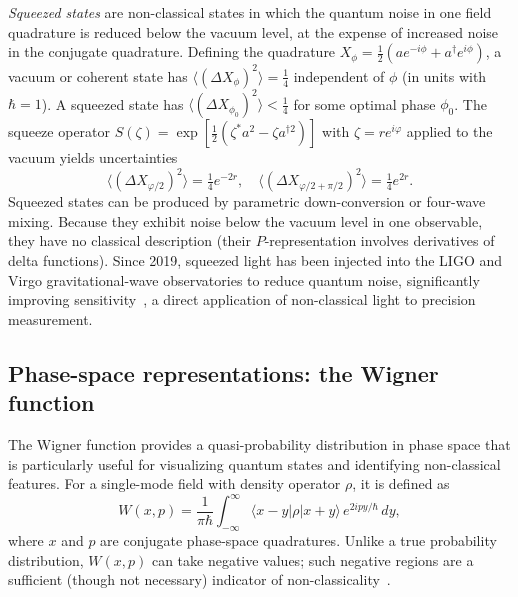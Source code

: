 \documentclass[12pt]{iopart}
\begin{document}
\textit{Squeezed states} are non-classical states in which the quantum noise in one field quadrature is reduced below the vacuum level, at the expense of increased noise in the conjugate quadrature. Defining the quadrature $X_\phi = \tfrac{1}{2}(a e^{-i\phi} + a^\dagger e^{i\phi})$, a vacuum or coherent state has $\langle(\Delta X_\phi)^2\rangle = \tfrac{1}{4}$ independent of $\phi$ (in units with $\hbar = 1$). A squeezed state has $\langle(\Delta X_{\phi_0})^2\rangle < \tfrac{1}{4}$ for some optimal phase $\phi_0$. The squeeze operator $S(\zeta) = \exp[\tfrac{1}{2}(\zeta^* a^2 - \zeta a^{\dagger 2})]$ with $\zeta = r e^{i\varphi}$ applied to the vacuum yields uncertainties
\begin{equation}
\langle (\Delta X_{\varphi/2})^2 \rangle = \tfrac{1}{4} e^{-2r}, \quad
\langle (\Delta X_{\varphi/2 + \pi/2})^2 \rangle = \tfrac{1}{4} e^{2r}.
\label{eq:squeeze}
\end{equation}
Squeezed states can be produced by parametric down-conversion or four-wave mixing. Because they exhibit noise below the vacuum level in one observable, they have no classical description (their $P$-representation involves derivatives of delta functions). Since 2019, squeezed light has been injected into the LIGO and Virgo gravitational-wave observatories to reduce quantum noise, significantly improving sensitivity~\cite{aasi2013, tse2019}, a direct application of non-classical light to precision measurement.


\subsection{Phase-space representations: the Wigner function}
\label{sec:wigner}

The Wigner function provides a quasi-probability distribution in phase space that is particularly useful for visualizing quantum states and identifying non-classical features. For a single-mode field with density operator $\rho$, it is defined as~\cite{wigner1932}
\begin{equation}
W(x, p) = \frac{1}{\pi\hbar} \int_{-\infty}^{\infty} \langle x - y | \rho | x + y \rangle \, e^{2ipy/\hbar} \, dy,
\label{eq:wigner_def}
\end{equation}
where $x$ and $p$ are conjugate phase-space quadratures. Unlike a true probability distribution, $W(x,p)$ can take negative values; such negative regions are a sufficient (though not necessary) indicator of non-classicality~\cite{hudson1974}.
\end{document}
